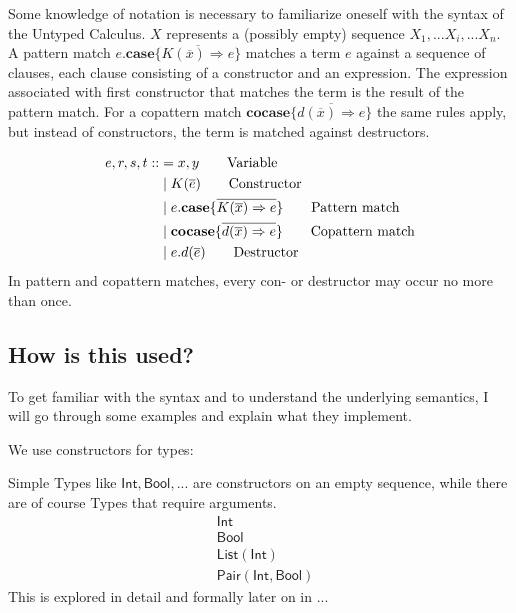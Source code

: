 \documentclass[twoside,12pt,a4paper]{article}
\begin{document}


Some knowledge of notation is necessary to familiarize oneself with the syntax of the Untyped Calculus.
$X$ represents a (possibly empty) sequence $X_1, ... X_i, ... X_n$.  
\\
A pattern match $e.\textbf{case}\{\overline{K(\overline{x})\Rightarrow e}\}$ 
matches a term $e$ against a sequence of clauses, each clause consisting of a constructor and an expression.
The expression associated with first constructor %
that matches the term is the result of the pattern match. %
For a copattern match $\textbf{cocase} \{\overline{d(\overline{x}) \Rightarrow e}\}$
the same rules apply, but instead of constructors, the term is matched against destructors.

\begin{definition}
    \begin{align*}
    e,r,s,t ::&=  x,y  \tag*{Variable} \\
        &\;|\;K(\overline{e}) \tag*{Constructor} \\
        &\;|\;e.\textbf{case}\{\overline{K(\overline{x})\Rightarrow e}\}  \tag*{Pattern match}\\
        &\;|\;\textbf{cocase}\{\overline{d(\overline{x})\Rightarrow e}\}  \tag*{Copattern match}\\
        &\;|\;e.d(\overline{e})  \tag*{Destructor}
    \end{align*}
    In pattern and copattern matches, every con- or destructor may occur no more than once.
\end{definition}

\subsection{How is this used?}


To get familiar with the syntax and to understand the underlying semantics, I will go through some examples and explain what they implement.

We use constructors for types:
\begin{example}
    Simple Types like $\mathsf{Int, Bool, ...}$ are constructors on an empty sequence, 
    while there are of course Types that require arguments. %
    \begin{align*}
        &\mathsf{Int}\\
        &\mathsf{Bool}\\
        &\mathsf{List(Int)}\\
        &\mathsf{Pair(Int, Bool)}
    \end{align*}
    This is explored in detail and formally later on in ... %
\end{example}
\end{document}
